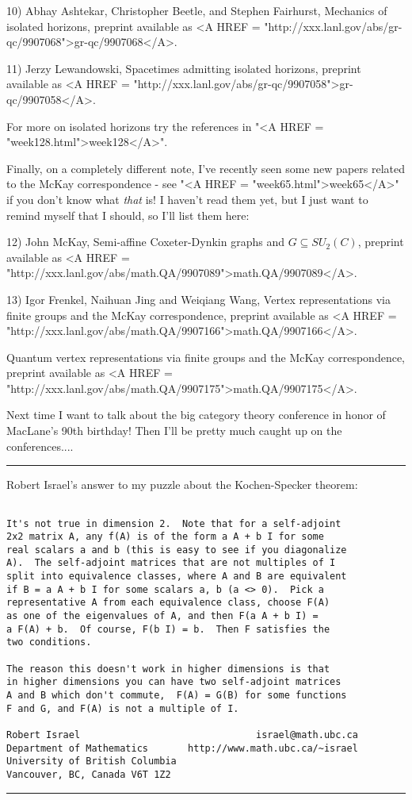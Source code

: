 10) Abhay Ashtekar, Christopher Beetle, and Stephen Fairhurst, 
Mechanics of isolated horizons, preprint available as <A HREF = "http://xxx.lanl.gov/abs/gr-qc/9907068">gr-qc/9907068</A>.

11) Jerzy Lewandowski, Spacetimes admitting isolated horizons, 
preprint available as <A HREF = "http://xxx.lanl.gov/abs/gr-qc/9907058">gr-qc/9907058</A>.

For more on isolated horizons try the references in "<A HREF = "week128.html">week128</A>".  
 
Finally, on a completely different note, I've recently seen some
new papers related to the McKay correspondence - see "<A HREF = "week65.html">week65</A>" if
you don't know what \emph{that} is!  I haven't read them yet, but I 
just want to remind myself that I should, so I'll list them here:

12) John McKay, Semi-affine Coxeter-Dynkin graphs and $G \subseteq
SU_2(C)$, preprint available as <A HREF = "http://xxx.lanl.gov/abs/math.QA/9907089">math.QA/9907089</A>.

13) Igor Frenkel, Naihuan Jing and Weiqiang Wang, Vertex 
representations via finite groups and the McKay correspondence,
preprint available as <A HREF = "http://xxx.lanl.gov/abs/math.QA/9907166">math.QA/9907166</A>.

Quantum vertex
representations via finite groups and the McKay correspondence,
preprint available as <A HREF = "http://xxx.lanl.gov/abs/math.QA/9907175">math.QA/9907175</A>.

Next time I want to talk about the big category theory conference
in honor of MacLane's 90th birthday!  Then I'll be pretty much
caught up on the conferences....


\par\noindent\rule{\textwidth}{0.4pt}
Robert Israel's answer to my puzzle about the Kochen-Specker theorem:


\begin{verbatim}

It's not true in dimension 2.  Note that for a self-adjoint 
2x2 matrix A, any f(A) is of the form a A + b I for some 
real scalars a and b (this is easy to see if you diagonalize 
A).  The self-adjoint matrices that are not multiples of I 
split into equivalence classes, where A and B are equivalent 
if B = a A + b I for some scalars a, b (a <> 0).  Pick a 
representative A from each equivalence class, choose F(A) 
as one of the eigenvalues of A, and then F(a A + b I) = 
a F(A) + b.  Of course, F(b I) = b.  Then F satisfies the 
two conditions.

The reason this doesn't work in higher dimensions is that 
in higher dimensions you can have two self-adjoint matrices 
A and B which don't commute,  F(A) = G(B) for some functions 
F and G, and F(A) is not a multiple of I.

Robert Israel                               israel@math.ubc.ca
Department of Mathematics       http://www.math.ubc.ca/~israel 
University of British Columbia            
Vancouver, BC, Canada V6T 1Z2

\end{verbatim}
    



 \par\noindent\rule{\textwidth}{0.4pt}

